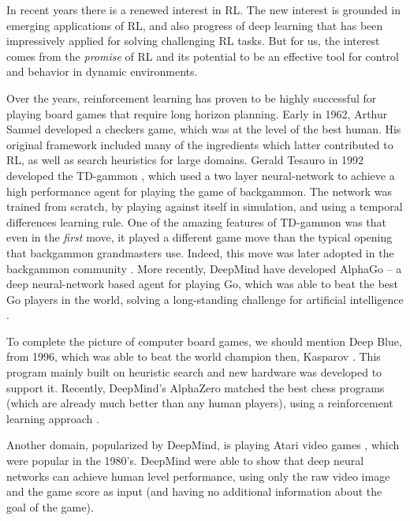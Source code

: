 In recent years there is a renewed interest in RL. The new interest is grounded in  emerging applications
of RL, and also progress of deep learning that
has been impressively applied for solving challenging RL tasks. 
But for us, the interest comes from the {\em promise} of RL and its
potential to be an effective tool for control and behavior in dynamic environments.

Over the years, reinforcement learning has proven to be highly
successful for playing board games that require long horizon planning. 
Early in 1962, Arthur Samuel \cite{Samuel62} developed a checkers game, which was at
the level of the best human. His original framework included many of
the ingredients which latter contributed to RL,
as well as search heuristics for large domains.
Gerald
Tesauro in 1992 developed the TD-gammon \cite{Tesauro95}, which used a two layer
neural-network to achieve a high performance agent for playing the game of backgammon. The network was trained from scratch, by playing against itself in simulation, and using a temporal differences learning rule. One of the amazing features
of TD-gammon was that even in the {\em first} move, it played a
different game move than the typical opening that backgammon grandmasters use. Indeed, this move was later adopted in the backgammon community \cite{Tesauro02}.
More recently, DeepMind have developed AlphaGo -- a deep neural-network based agent
for playing Go, which was able to beat the best Go players in the world, solving a long-standing challenge for artificial intelligence \cite{SilverHMGSDSAPL16}. 

To complete the picture of computer board games, we should mention
Deep Blue, from 1996, which was able to beat the world champion then,
Kasparov \cite{DeepBlue}. This program mainly built on heuristic search and new hardware was developed to support it. Recently, DeepMind's
AlphaZero matched the best chess
programs (which are already much better than any human players), using a reinforcement learning approach \cite{silver2017mastering}.

Another domain, popularized by DeepMind, is playing Atari video
games \cite{mnih2015human}, which were popular in the 1980's. DeepMind were able to
show that deep neural networks can achieve human level performance,
using only the raw video image and the game score as input (and having no additional
information about the goal of the game). 

